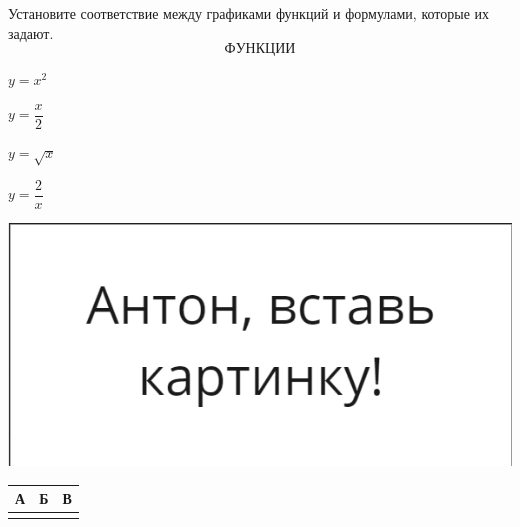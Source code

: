 \begin{class}[number=3]
\begin{listofex}
		\item 
		\begin{minipage}[t]{0.57\textwidth}
			Установите соответствие между графиками функций и формулами, которые их задают. 
			\[ФУНКЦИИ\]
			\begin{enumcols}[itemcolumns=1]
				\item \( y=x^2 \)
				\item \( y=\dfrac{x}{2} \)
				\item \( y=\sqrt{x} \)
				\item \( y=\dfrac{2}{x} \)
			\end{enumcols}
		\end{minipage}
		\begin{minipage}[c]{0.3\textwidth}
			\includegraphics[align=t, width=\textwidth]{pics/G91M4L4-1}
		\end{minipage}
		\begin{center}
			\footnotesize
			\begin{tabular}{|c|c|c|}
				\hline
				А&Б&В\\
				\hline
			 & & \\
			 \hline
			\end{tabular}
		\end{center}
	

\end{listofex}
\end{class}
